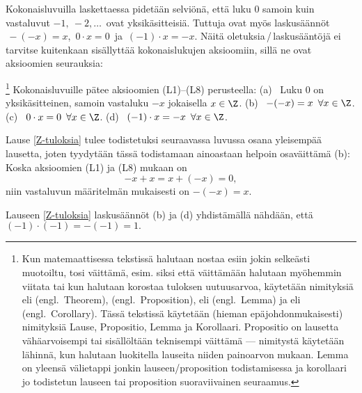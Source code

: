 Kokonaisluvuilla laskettaessa pidetään selviönä, että luku $0$ samoin kuin vastaluvut $-1,\ -2, \ldots\,$
ovat yksikäsitteisiä. Tuttuja ovat myös laskusäännöt $\,-(-x)=x$, $\,0 \cdot x=0\,$ ja $\,(-1) \cdot x = -x$.
Näitä oletuksia\,/\,laskusääntöjä ei tarvitse kuitenkaan sisällyttää kokonaislukujen aksioomiin, sillä ne
ovat aksioomien seurauksia:
\begin{Lause}\footnote[2]{Kun matemaattisessa tekstissä halutaan nostaa esiin jokin selkeästi 
muotoiltu, tosi väittämä, esim. siksi että väittämään halutaan myöhemmin viitata tai kun 
halutaan korostaa tuloksen uutuusarvoa, käytetään nimityksiä  eli  
(engl.\ Theorem),  (engl.\ Proposition),  eli  
(engl.\ Lemma) ja  eli  (engl.\ Corollary). Tässä tekstissä 
käytetään (hieman epäjohdonmukaisesti) nimityksiä Lause, Propositio, Lemma ja Korollaari. 
Propositio on lausetta vähäarvoisempi tai sisällöltään teknisempi väittämä --- nimitystä 
käytetään lähinnä, kun halutaan luokitella lauseita niiden painoarvon mukaan. Lemma on yleensä
välietappi jonkin lauseen/proposition todistamisessa ja korollaari jo todistetun lauseen tai 
proposition suoraviivainen seuraamus.} \label{Z-tuloksia} Kokonaisluvuille pätee aksioomien
(L1)--(L8) perusteella: \vspace{1mm}\newline
(a) \ Luku $0$ on yksikäsitteinen, samoin vastaluku $-x$ jokaisella $x\in\Z$. \newline
(b) \ $-(-x)=x\,\ \forall x\in\Z$. \newline
(c) \ $0 \cdot x = 0\,\ \forall x\in\Z$. \newline
(d) \ $(-1) \cdot x = -x\,\ \forall x\in\Z$. 
\end{Lause}
Lause \ref{Z-tuloksia} tulee todistetuksi seuraavassa luvussa osana yleisempää lausetta,
joten tyydytään tässä todistamaan ainoastaan helpoin osaväittämä (b): Koska aksioomien
(L1) ja (L8) mukaan on
\[
-x+x = x+(-x) = 0,
\]
niin vastaluvun määritelmän mukaisesti on $-(-x)=x$. \loppu
\begin{Exa} Lauseen \ref{Z-tuloksia} laskusäännöt (b) ja (d) yhdistämällä nähdään, että
$(-1)\cdot(-1)=-(-1)=1.$ \loppu \end{Exa}

